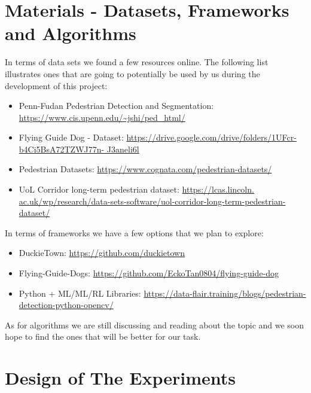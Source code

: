 \documentclass[letterpaper,10pt]{article}
\begin{document}
\section{Materials - Datasets, Frameworks and Algorithms} 

In terms of data sets we found a few resources online. The following list
illustrates ones that are going to potentially be used by us during the 
development of this project:
\begin{itemize}
  \item Penn-Fudan Pedestrian Detection and Segmentation: 
    \url{https://www.cis.upenn.edu/~jshi/ped_html/} 
  \item Flying Guide Dog - Dataset: 
    \url{https://drive.google.com/drive/folders/1UFcr-b4Ci5BsA72TZWJ77n-
    J3aneli6l}
  \item Pedestrian Datasets: \url{https://www.cognata.com/pedestrian-datasets/}
  \item UoL Corridor long-term pedestrian dataset: \url{https://lcas.lincoln.
    ac.uk/wp/research/data-sets-software/uol-corridor-long-term-pedestrian-
    dataset/}
\end{itemize}
In terms of frameworks we have a few options that we plan to explore: 
\begin{itemize}
  \item DuckieTown: \url{https://github.com/duckietown} 
  \item Flying-Guide-Dogs: 
    \url{https://github.com/EckoTan0804/flying-guide-dog}
  \item Python + ML/ML/RL Libraries: 
    \url{https://data-flair.training/blogs/pedestrian-detection-python-opencv/}
\end{itemize}
As for algorithms we are still discussing and reading about the topic and we
soon hope to find the ones that will be better for our task.

\section{Design of The Experiments}
\end{document}

